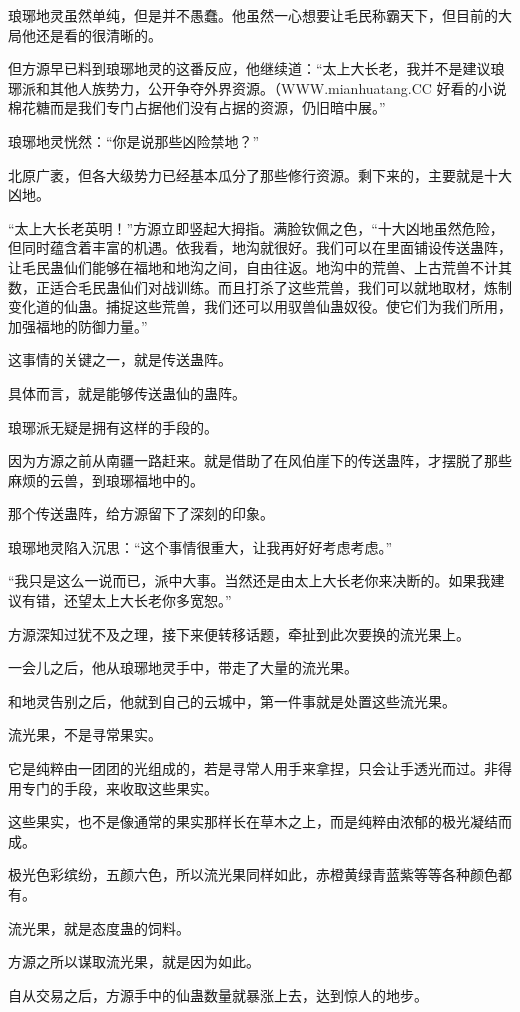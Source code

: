 \begin{this_body}
琅琊地灵虽然单纯，但是并不愚蠢。他虽然一心想要让毛民称霸天下，但目前的大局他还是看的很清晰的。

但方源早已料到琅琊地灵的这番反应，他继续道：“太上大长老，我并不是建议琅琊派和其他人族势力，公开争夺外界资源。（WWW.mianhuatang.CC 好看的小说棉花糖而是我们专门占据他们没有占据的资源，仍旧暗中展。”

琅琊地灵恍然：“你是说那些凶险禁地？”

北原广袤，但各大级势力已经基本瓜分了那些修行资源。剩下来的，主要就是十大凶地。

“太上大长老英明！”方源立即竖起大拇指。满脸钦佩之色，“十大凶地虽然危险，但同时蕴含着丰富的机遇。依我看，地沟就很好。我们可以在里面铺设传送蛊阵，让毛民蛊仙们能够在福地和地沟之间，自由往返。地沟中的荒兽、上古荒兽不计其数，正适合毛民蛊仙们对战训练。而且打杀了这些荒兽，我们可以就地取材，炼制变化道的仙蛊。捕捉这些荒兽，我们还可以用驭兽仙蛊奴役。使它们为我们所用，加强福地的防御力量。”

这事情的关键之一，就是传送蛊阵。

具体而言，就是能够传送蛊仙的蛊阵。

琅琊派无疑是拥有这样的手段的。

因为方源之前从南疆一路赶来。就是借助了在风伯崖下的传送蛊阵，才摆脱了那些麻烦的云兽，到琅琊福地中的。

那个传送蛊阵，给方源留下了深刻的印象。

琅琊地灵陷入沉思：“这个事情很重大，让我再好好考虑考虑。”

“我只是这么一说而已，派中大事。当然还是由太上大长老你来决断的。如果我建议有错，还望太上大长老你多宽恕。”

方源深知过犹不及之理，接下来便转移话题，牵扯到此次要换的流光果上。

一会儿之后，他从琅琊地灵手中，带走了大量的流光果。

和地灵告别之后，他就到自己的云城中，第一件事就是处置这些流光果。

流光果，不是寻常果实。

它是纯粹由一团团的光组成的，若是寻常人用手来拿捏，只会让手透光而过。非得用专门的手段，来收取这些果实。

这些果实，也不是像通常的果实那样长在草木之上，而是纯粹由浓郁的极光凝结而成。

极光色彩缤纷，五颜六色，所以流光果同样如此，赤橙黄绿青蓝紫等等各种颜色都有。

流光果，就是态度蛊的饲料。

方源之所以谋取流光果，就是因为如此。

自从交易之后，方源手中的仙蛊数量就暴涨上去，达到惊人的地步。


\end{this_body}
